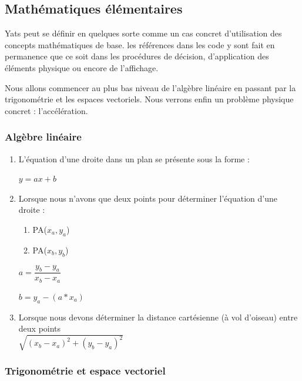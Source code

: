\documentclass[a4paper,11pt]{article}
\begin{document}
\subsection{Mathématiques élémentaires}

Yats peut se définir en quelques sorte comme un cas concret d'utilisation des concepts mathématiques de base. les références dans les code y sont fait en permanence que ce soit dans les procédures de décision, d'application des éléments physique ou encore de l'affichage.

Nous allons commencer au plus bas niveau de l'algèbre linéaire en passant par la trigonométrie et les espaces vectoriels. Nous verrons enfin un problème physique concret : l'accélération. 

\subsubsection{Algèbre linéaire}

\begin{enumerate}[label=-]
\item 
L'équation d'une droite dans un plan se présente sous la forme : 

$ y=ax+b $

\item 
Lorsque nous n'avons que deux points pour déterminer l'équation d'une droite : 

\begin{enumerate}[label=.]
\item PA($x_a , y_a$)
\item PA($x_b , y_b$)
\end{enumerate}


$ a = \dfrac{y_b-y_a}{x_b-x_a} $ 

$ b = y_a - (a*x_a) $

\item
Lorsque nous devons déterminer la distance cartésienne (à vol d'oiseau) entre deux points \\

$ \sqrt{(x_b-x_a)^2 + (y_b-y_a)^2 } $

\end{enumerate}

\subsubsection{Trigonométrie et espace vectoriel}
\end{document}
